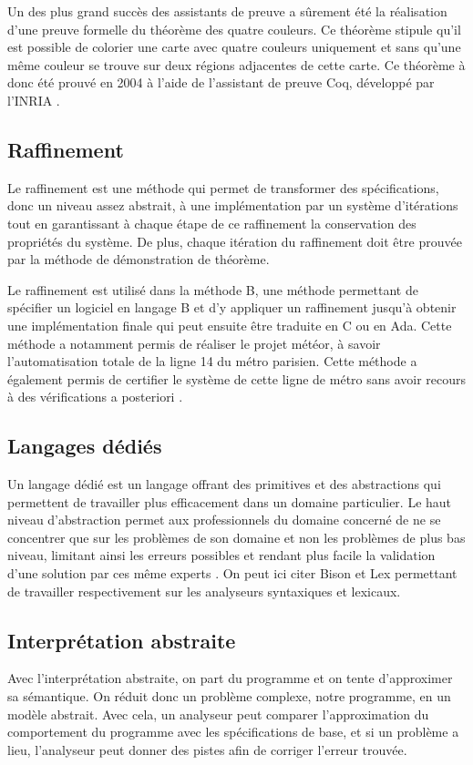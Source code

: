 \documentclass[12pt]{report}
\begin{document}
Un des plus grand succès des assistants de preuve a sûrement été la réalisation d'une preuve formelle du théorème des quatre couleurs. Ce théorème stipule qu'il est possible de colorier une carte avec quatre couleurs uniquement et sans qu'une même couleur se trouve sur deux régions adjacentes de cette carte. Ce théorème à donc été prouvé en 2004 à l'aide de l'assistant de preuve Coq, développé par l'INRIA \cite{delahaye}.     

\subsection{Raffinement}

Le raffinement est une méthode qui permet de transformer des spécifications, donc un niveau assez abstrait, à une implémentation par un système d'itérations tout en garantissant à chaque étape de ce raffinement la conservation des propriétés du système. De plus, chaque itération du raffinement doit être prouvée par la méthode de démonstration de théorème.

Le raffinement est utilisé dans la méthode B, une méthode permettant de spécifier un logiciel en langage B et d'y appliquer un raffinement jusqu'à obtenir une implémentation finale qui peut ensuite être traduite en C ou en Ada. Cette méthode a notamment permis de réaliser le projet météor, à savoir l'automatisation totale de la ligne 14 du métro parisien. Cette méthode a également permis de certifier le système de cette ligne de métro sans avoir recours à des vérifications a posteriori \cite{griffault}.      
\subsection{Langages dédiés}
Un langage dédié est un langage offrant des primitives et des abstractions qui permettent de travailler plus efficacement dans un domaine particulier. Le haut niveau d'abstraction permet aux professionnels du domaine concerné de ne se concentrer que sur les problèmes de son domaine et non les problèmes de plus bas niveau, limitant ainsi les erreurs possibles et rendant plus facile la validation d'une solution par ces même experts \cite{Deuklvi}. On peut ici citer Bison et Lex permettant de travailler respectivement sur les analyseurs syntaxiques et lexicaux.
\subsection{Interprétation abstraite}
Avec l'interprétation abstraite, on part du programme et on tente d'approximer sa sémantique. On réduit donc un problème complexe, notre programme, en un modèle abstrait. Avec cela, un analyseur peut comparer l'approximation du comportement du programme avec les spécifications de base, et si un problème a lieu, l'analyseur peut donner des pistes afin de corriger l'erreur trouvée.
\end{document}
